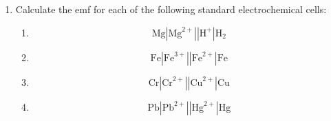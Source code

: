 {\begin{enumerate}
The reaction in the copper half cell is given by:

$\rm{Cu \rightarrow Cu^{2+} + 2e^{-}}$\\

	\begin{enumerate}
	\item{Write down the standard conditions which apply to this electrochemical cell.}
	\item{Identify the metal M. Show calculations.}
	\item Use the standard electrode potentials to write down equations for the:
		\begin{enumerate}
		\item{cathode half-reaction}
		\item{anode half-reaction}
		\item{overall cell reaction}
		\end{enumerate}
	\item{What is the purpose of the salt bridge?}
	\item{Explain why a KCl solution would not be suitable for use in the salt bridge in this cell.}
	\end{enumerate}

(IEB Paper 2, 2004)

\item Calculate the emf for each of the following standard electrochemical cells:

	\begin{enumerate}

\item 
\begin{equation*}
\text{Mg}|\text{Mg}^{2+}||\text{H}^{+}|\text{H}_{2}
\end{equation*}

\item
\begin{equation*}
\text{Fe}|\text{Fe}^{3+}||\text{Fe}^{2+}|\text{Fe}
\end{equation*}


\item
\begin{equation*}
\text{Cr}|\text{Cr}^{2+}||\text{Cu}^{2+}|\text{Cu}
\end{equation*}


\item
\begin{equation*}
\text{Pb}|\text{Pb}^{2+}||\text{Hg}^{2+}|\text{Hg}
\end{equation*}

\end{enumerate}


\end{enumerate}}
